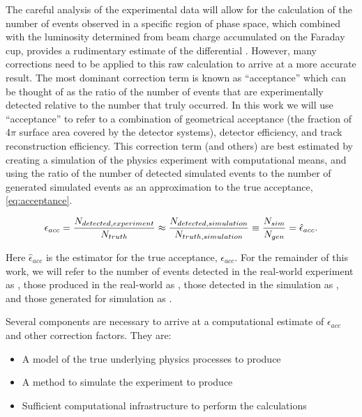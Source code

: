 The careful analysis of the experimental data will allow for the calculation of the number of events observed in a specific region of phase space, which combined with the luminosity determined from beam charge accumulated on the Faraday cup, provides a rudimentary estimate of the differential \xsec. However, many corrections need to be applied to this raw calculation to arrive at a more accurate result. The most dominant correction term is known as ``acceptance'' which can be thought of as the ratio of the number of events that are experimentally detected relative to the number that truly occurred. In this work we will use ``acceptance'' to refer to a combination of geometrical acceptance (the fraction of 4$\pi$ surface area covered by the detector systems), detector efficiency, and track reconstruction efficiency. This correction term (and others) are best estimated by creating a simulation of the physics experiment with computational means, and using the ratio of the number of detected simulated events to the number of generated simulated events as an approximation to the true acceptance, \eqref{eq:acceptance}. 



  \begin{equation}\labelAndRemember{eq:acceptance}
                   {\epsilon_{acc} = \frac{N_{detected,experiment}}{N_{truth}} \approx  \frac{N_{detected,simulation}}{N_{truth,simulation}}  \equiv \frac{N_{sim}}{N_{gen}} = \hat{\epsilon}_{acc}}.
             \end{equation}      
             

Here $\hat{\epsilon}_{acc}$ is the estimator for the true acceptance, $\epsilon_{acc}$. For the remainder of this work, we will refer to the number of events detected in the real-world experiment as \Nexp, those produced in the real-world as \Ntruth, those detected in the simulation as \Nsim, and those generated for simulation as \Ngen.  

Several components are necessary to arrive at a computational estimate of $\epsilon_{acc}$ and other correction factors. They are: 

\begin{itemize}
    \item A model of the true underlying physics processes to produce \Ngen {}
    \item A method to simulate the experiment to produce \Nsim {}
    \item Sufficient computational infrastructure to perform the calculations 
\end{itemize}



